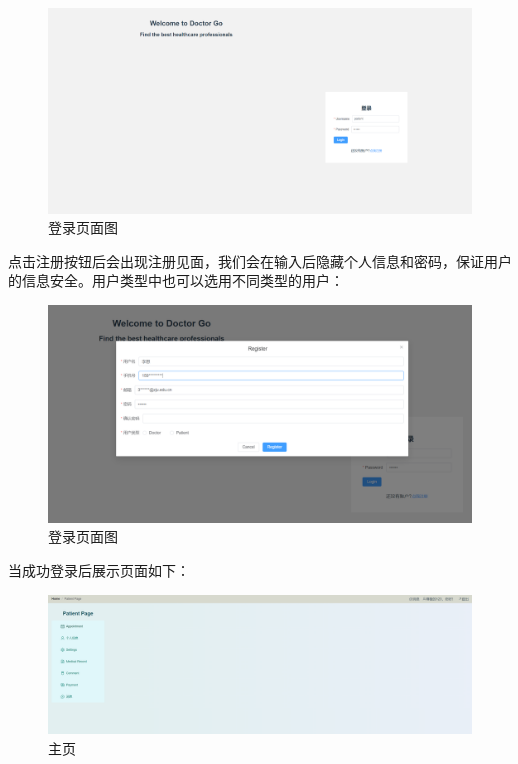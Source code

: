 \begin{figure}[!h]
	\centering
	\includegraphics[width=\textwidth]{figures/a1.png}
	\caption{登录页面图}
\end{figure}
点击注册按钮后会出现注册见面，我们会在输入后隐藏个人信息和密码，保证用户的信息安全。用户类型中也可以选用不同类型的用户：
\begin{figure}[!h]
	\centering
	\includegraphics[width=\textwidth]{figures/a2.png}
	\caption{登录页面图}
\end{figure}
当成功登录后展示页面如下：
\begin{figure}[!h]
	\centering
	\includegraphics[width=\textwidth]{figures/a3.png}
	\caption{主页}
\end{figure}
